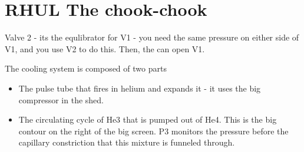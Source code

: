 \section{RHUL The chook-chook}
\begin{framed}\noindent
  Valve 2 - its  the equlibrator for V1 - you  need the same pressure
  on either  side of V1, and  you use V2  to do this.  Then,  the can
  open V1.
\end{framed}
\begin{framed}\noindent
  The cooling system is composed of two parts
  \begin{itemize}
  \item The pulse tube that fires in  helium and expands it - it uses
    the big compressor in the shed.
  \item The circulating cycle of He3  that is pumped out of He4. This
    is the  big contour on the  right of the big  screen. P3 monitors
    the pressure before the  capillary constriction that this mixture
    is funneled through.
  \end{itemize}
\end{framed}

